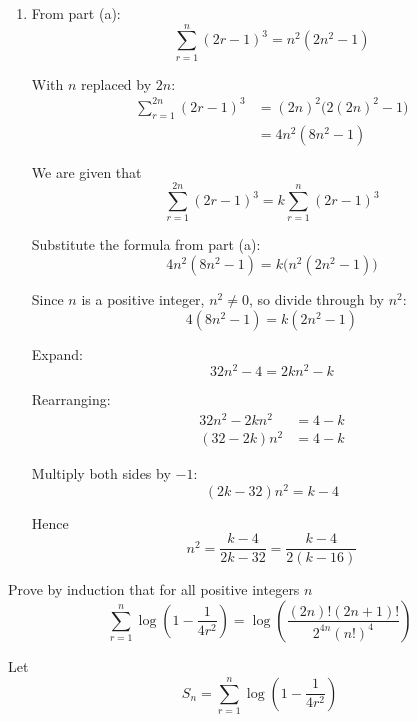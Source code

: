 \documentclass[leqno]{article}
\begin{document}
\begin{enumerate}[
  label=\textbf{\arabic*.},
  leftmargin=*,
  topsep=0pt,
  partopsep=0pt,
  parsep=0pt
]
\begin{djsSolution}
\begin{enumerate}[label=\textbf{(\alph*)}]
  Hence
  \[
  S_{k+1}=(k+1)^2\bigl(2(k+1)^2-1\bigr)
  \]

  so the statement is true for $n=k+1$.

  \textbf{Conclusion:} If the statement is true for $n=k$, then it is true for $n=k+1$. Since it is true for $n=1$, by the principle of mathematical induction the statement is true for all positive integers $n$.

  \item From part (a):
  \[
  \sum_{r=1}^{n}(2r-1)^3=n^2(2n^2-1)
  \]

  With $n$ replaced by $2n$:
  \begin{align*}
  \sum_{r=1}^{2n}(2r-1)^3
  &=(2n)^2\bigl(2(2n)^2-1\bigr) \\
  &=4n^2(8n^2-1)
  \end{align*}

  We are given that
  \[
  \sum_{r=1}^{2n}(2r-1)^3=k\sum_{r=1}^{n}(2r-1)^3
  \]

  Substitute the formula from part (a):
  \[
  4n^2(8n^2-1)=k\bigl(n^2(2n^2-1)\bigr)
  \]

  Since $n$ is a positive integer, $n^2\neq 0$, so divide through by $n^2$:
  \[
  4(8n^2-1)=k(2n^2-1)
  \]

  Expand:
  \[
  32n^2-4=2kn^2-k
  \]

  Rearranging:
  \begin{align*}
  32n^2-2kn^2&=4-k \\
  (32-2k)n^2&=4-k
  \end{align*}

  Multiply both sides by $-1$:
  \[
  (2k-32)n^2=k-4
  \]

  Hence
  \[
  n^2=\frac{k-4}{2k-32}=\frac{k-4}{2(k-16)}
  \]

\end{enumerate}
\end{djsSolution}


\newpage

\questionitem

Prove by induction that for all positive integers $n$
\[
\sum_{r=1}^{n} \log\left(1-\frac{1}{4r^2}\right)=\log\left(\frac{(2n)!(2n+1)!}{2^{4n}(n!)^4}\right)
\]

\vspace*{10pt}

\begin{djsSolution}
Let
\[
S_n=\sum_{r=1}^{n}\log\left(1-\frac{1}{4r^2}\right)
\]


\end{djsSolution}
\end{enumerate}
\end{document}
